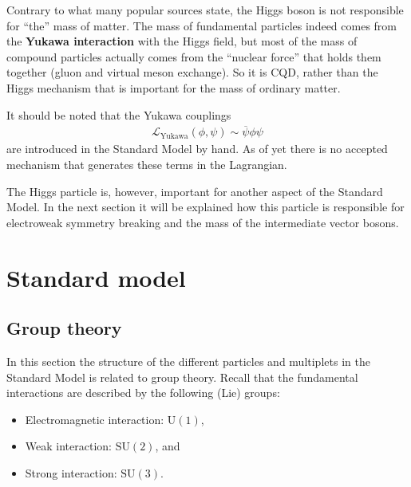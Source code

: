     \begin{remark}
        Contrary to what many popular sources state, the Higgs boson is not responsible for ``the'' mass of matter. The mass of fundamental particles indeed comes from the \textbf{Yukawa interaction} with the Higgs field, but most of the mass of compound particles actually comes from the ``nuclear force'' that holds them together (gluon and virtual meson exchange). So it is CQD, rather than the Higgs mechanism that is important for the mass of ordinary matter.

        It should be noted that the Yukawa couplings
        \begin{gather}
            \mathcal{L}_\text{Yukawa}(\phi,\psi)\sim\overline{\psi}\phi\psi
        \end{gather}
        are introduced in the Standard Model by hand. As of yet there is no accepted mechanism that generates these terms in the Lagrangian.

        The Higgs particle is, however, important for another aspect of the Standard Model. In the next section it will be explained how this particle is responsible for electroweak symmetry breaking and the mass of the intermediate vector bosons.
    \end{remark}

\section{Standard model}
\subsection{Group theory}

    In this section the structure of the different particles and multiplets in the Standard Model is related to group theory. Recall that the fundamental interactions are described by the following (Lie) groups:
    \begin{itemize}
        \item Electromagnetic interaction: $\mathrm{U}(1)$,
        \item Weak interaction: $\mathrm{SU}(2)$, and
        \item Strong interaction: $\mathrm{SU}(3)$.
    \end{itemize}

